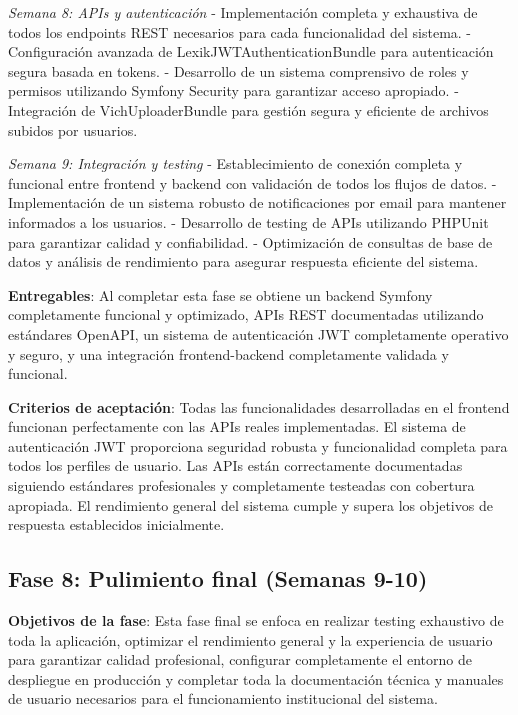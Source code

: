 \documentclass[12pt,a4paper,oneside]{report}
\begin{document}
\emph{Semana 8: APIs y autenticación} - Implementación completa y exhaustiva de todos los endpoints REST necesarios para cada funcionalidad del sistema. - Configuración avanzada de LexikJWTAuthenticationBundle para autenticación segura basada en tokens. - Desarrollo de un sistema comprensivo de roles y permisos utilizando Symfony Security para garantizar acceso apropiado. - Integración de VichUploaderBundle para gestión segura y eficiente de archivos subidos por usuarios.

\emph{Semana 9: Integración y testing} - Establecimiento de conexión completa y funcional entre frontend y backend con validación de todos los flujos de datos. - Implementación de un sistema robusto de notificaciones por email para mantener informados a los usuarios. - Desarrollo de testing de APIs utilizando PHPUnit para garantizar calidad y confiabilidad. - Optimización de consultas de base de datos y análisis de rendimiento para asegurar respuesta eficiente del sistema.

\textbf{Entregables}: Al completar esta fase se obtiene un backend Symfony completamente funcional y optimizado, APIs REST documentadas utilizando estándares OpenAPI, un sistema de autenticación JWT completamente operativo y seguro, y una integración frontend-backend completamente validada y funcional.

\textbf{Criterios de aceptación}: Todas las funcionalidades desarrolladas en el frontend funcionan perfectamente con las APIs reales implementadas. El sistema de autenticación JWT proporciona seguridad robusta y funcionalidad completa para todos los perfiles de usuario. Las APIs están correctamente documentadas siguiendo estándares profesionales y completamente testeadas con cobertura apropiada. El rendimiento general del sistema cumple y supera los objetivos de respuesta establecidos inicialmente.

\subsection{Fase 8: Pulimiento final (Semanas
9-10)}\label{fase-8-pulimiento-final-semanas-9-10}

\textbf{Objetivos de la fase}: Esta fase final se enfoca en realizar testing exhaustivo de toda la aplicación, optimizar el rendimiento general y la experiencia de usuario para garantizar calidad profesional, configurar completamente el entorno de despliegue en producción y completar toda la documentación técnica y manuales de usuario necesarios para el funcionamiento institucional del sistema.
\end{document}
